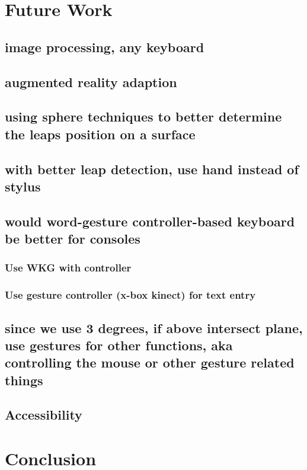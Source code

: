\section{Future Work}

\subsection{image processing, any keyboard}

\subsection{augmented reality adaption}

\subsection{using sphere techniques to better determine the leaps position on a surface}

\subsection{with better leap detection, use hand instead of stylus}

\subsection{would word-gesture controller-based keyboard be better for consoles}

\subsubsection{Use WKG with controller}

\subsubsection{Use gesture controller (x-box kinect) for text entry}

\subsection{since we use 3 degrees, if above intersect plane, use gestures for other functions, aka controlling the mouse or other gesture related things}

\subsection{Accessibility}

\section {Conclusion}
